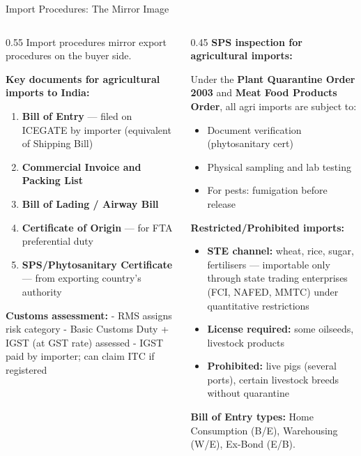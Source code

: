 \documentclass[
  ignorenonframetext,
  aspectratio=169,
]{beamer}
\makeatletter
\providecommand{\tightlist}{%
  \setlength{\itemsep}{0pt}\setlength{\parskip}{0pt}}
\let\quarto@originallabel\label
\DeclareRobustCommand*{\label}[1]{\quarto@originallabel{#1}}
\makeatother
\begin{document}
\begin{frame}
\begin{block}{Import Procedures: The Mirror Image}
\label{import-procedures-the-mirror-image}
\begin{columns}[T]
\begin{column}{0.55\linewidth}
Import procedures mirror export procedures on the buyer side.

\textbf{Key documents for agricultural imports to India:}

\begin{enumerate}
\tightlist
\item
  \textbf{Bill of Entry} --- filed on ICEGATE by importer (equivalent of
  Shipping Bill)
\item
  \textbf{Commercial Invoice and Packing List}
\item
  \textbf{Bill of Lading / Airway Bill}
\item
  \textbf{Certificate of Origin} --- for FTA preferential duty
\item
  \textbf{SPS/Phytosanitary Certificate} --- from exporting country's
  authority
\end{enumerate}

\textbf{Customs assessment:} - RMS assigns risk category - Basic Customs
Duty + IGST (at GST rate) assessed - IGST paid by importer; can claim
ITC if registered
\end{column}

\begin{column}{0.45\linewidth}
\textbf{SPS inspection for agricultural imports:}

Under the \textbf{Plant Quarantine Order 2003} and \textbf{Meat Food
Products Order}, all agri imports are subject to:

\begin{itemize}
\tightlist
\item
  Document verification (phytosanitary cert)
\item
  Physical sampling and lab testing
\item
  For pests: fumigation before release
\end{itemize}

\textbf{Restricted/Prohibited imports:}

\begin{itemize}
\tightlist
\item
  \textbf{STE channel:} wheat, rice, sugar, fertilisers --- importable
  only through state trading enterprises (FCI, NAFED, MMTC) under
  quantitative restrictions
\item
  \textbf{License required:} some oilseeds, livestock products
\item
  \textbf{Prohibited:} live pigs (several ports), certain livestock
  breeds without quarantine
\end{itemize}

\textbf{Bill of Entry types:} Home Consumption (B/E), Warehousing (W/E),
Ex-Bond (E/B).
\end{column}
\end{columns}
\end{block}
\end{frame}
\end{document}
